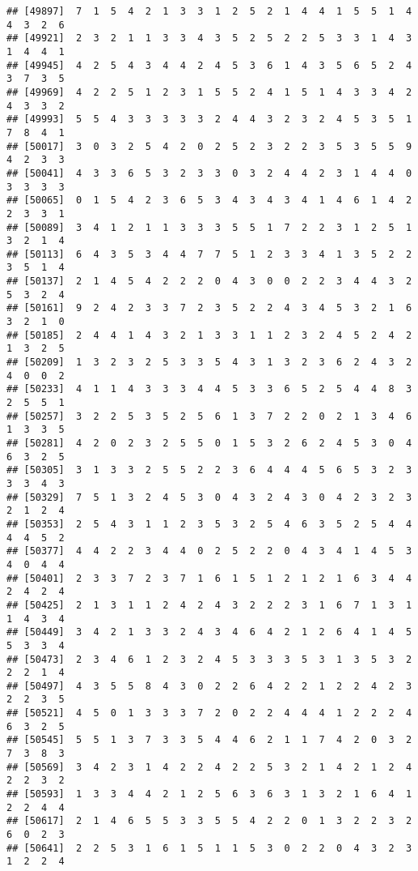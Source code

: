 \documentclass[
]{article}
\begin{document}
\begin{verbatim}
## [49897]  7  1  5  4  2  1  3  3  1  2  5  2  1  4  4  1  5  5  1  4  4  3  2  6
## [49921]  2  3  2  1  1  3  3  4  3  5  2  5  2  2  5  3  3  1  4  3  1  4  4  1
## [49945]  4  2  5  4  3  4  4  2  4  5  3  6  1  4  3  5  6  5  2  4  3  7  3  5
## [49969]  4  2  2  5  1  2  3  1  5  5  2  4  1  5  1  4  3  3  4  2  4  3  3  2
## [49993]  5  5  4  3  3  3  3  3  2  4  4  3  2  3  2  4  5  3  5  1  7  8  4  1
## [50017]  3  0  3  2  5  4  2  0  2  5  2  3  2  2  3  5  3  5  5  9  4  2  3  3
## [50041]  4  3  3  6  5  3  2  3  3  0  3  2  4  4  2  3  1  4  4  0  3  3  3  3
## [50065]  0  1  5  4  2  3  6  5  3  4  3  4  3  4  1  4  6  1  4  2  2  3  3  1
## [50089]  3  4  1  2  1  1  3  3  3  5  5  1  7  2  2  3  1  2  5  1  3  2  1  4
## [50113]  6  4  3  5  3  4  4  7  7  5  1  2  3  3  4  1  3  5  2  2  3  5  1  4
## [50137]  2  1  4  5  4  2  2  2  0  4  3  0  0  2  2  3  4  4  3  2  5  3  2  4
## [50161]  9  2  4  2  3  3  7  2  3  5  2  2  4  3  4  5  3  2  1  6  3  2  1  0
## [50185]  2  4  4  1  4  3  2  1  3  3  1  1  2  3  2  4  5  2  4  2  1  3  2  5
## [50209]  1  3  2  3  2  5  3  3  5  4  3  1  3  2  3  6  2  4  3  2  4  0  0  2
## [50233]  4  1  1  4  3  3  3  4  4  5  3  3  6  5  2  5  4  4  8  3  2  5  5  1
## [50257]  3  2  2  5  3  5  2  5  6  1  3  7  2  2  0  2  1  3  4  6  1  3  3  5
## [50281]  4  2  0  2  3  2  5  5  0  1  5  3  2  6  2  4  5  3  0  4  6  3  2  5
## [50305]  3  1  3  3  2  5  5  2  2  3  6  4  4  4  5  6  5  3  2  3  3  3  4  3
## [50329]  7  5  1  3  2  4  5  3  0  4  3  2  4  3  0  4  2  3  2  3  2  1  2  4
## [50353]  2  5  4  3  1  1  2  3  5  3  2  5  4  6  3  5  2  5  4  4  4  4  5  2
## [50377]  4  4  2  2  3  4  4  0  2  5  2  2  0  4  3  4  1  4  5  3  4  0  4  4
## [50401]  2  3  3  7  2  3  7  1  6  1  5  1  2  1  2  1  6  3  4  4  2  4  2  4
## [50425]  2  1  3  1  1  2  4  2  4  3  2  2  2  3  1  6  7  1  3  1  1  4  3  4
## [50449]  3  4  2  1  3  3  2  4  3  4  6  4  2  1  2  6  4  1  4  5  5  3  3  4
## [50473]  2  3  4  6  1  2  3  2  4  5  3  3  3  5  3  1  3  5  3  2  2  2  1  4
## [50497]  4  3  5  5  8  4  3  0  2  2  6  4  2  2  1  2  2  4  2  3  2  2  3  5
## [50521]  4  5  0  1  3  3  3  7  2  0  2  2  4  4  4  1  2  2  2  4  6  3  2  5
## [50545]  5  5  1  3  7  3  3  5  4  4  6  2  1  1  7  4  2  0  3  2  7  3  8  3
## [50569]  3  4  2  3  1  4  2  2  4  2  2  5  3  2  1  4  2  1  2  4  2  2  3  2
## [50593]  1  3  3  4  4  2  1  2  5  6  3  6  3  1  3  2  1  6  4  1  2  2  4  4
## [50617]  2  1  4  6  5  5  3  3  5  5  4  2  2  0  1  3  2  2  3  2  6  0  2  3
## [50641]  2  2  5  3  1  6  1  5  1  1  5  3  0  2  2  0  4  3  2  3  1  2  2  4

\end{verbatim}
\end{document}
